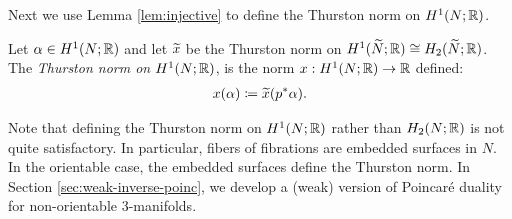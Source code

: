 Next we use Lemma \ref{lem:injective} to define the Thurston norm on $H^1(N; \mathbb{R})$.%

  Let $\alpha \in H^1(N;\mathbb{R})$ and let $\widetilde{x}$ be the Thurston norm on $H^1(\widetilde{N};\mathbb{R})\cong H_2(\widetilde{N};\mathbb{R})$.
  The \emph{Thurston norm on $H^1(N; \mathbb{R})$}, is the norm $x: H^1(N;\mathbb{R}) \rightarrow \mathbb{R}$ defined:
  \begin{align*}
    x(\alpha) \coloneqq \widetilde{x}(p^{\ast}\alpha).
  \end{align*}




Note that defining the Thurston norm on $H^1(N; \mathbb{R})$ rather than $H_2(N; \mathbb{R})$ is not quite satisfactory.
In particular, fibers of fibrations are embedded surfaces in $N$.  In the orientable case, the embedded surfaces define the Thurston norm.
In Section \ref{sec:weak-inverse-poinc}, we develop a (weak) version of Poincar\'e duality for non-orientable 3-manifolds.%

